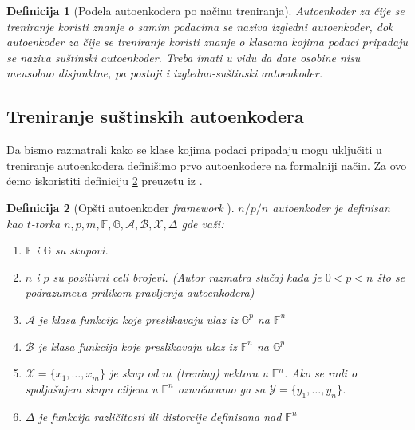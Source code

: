 \documentclass{article}
\newtheorem{definition}{Definicija}
\begin{document}
	\begin{definition}[Podela autoenkodera po na\v cinu treniranja]
		\label{autoencoder-training-based-types}
		Autoenkoder za \v cije se treniranje koristi znanje o samim podacima se naziva \emph{izgledni autoenkoder}, dok autoenkoder za \v cije se treniranje koristi znanje o klasama kojima podaci pripadaju se naziva \emph{su\v stinski autoenkoder}. Treba imati u vidu da date osobine nisu me\dj usobno disjunktne, pa postoji i \emph{izgledno-su\v stinski autoenkoder}.
	\end{definition}


	\subsection{Treniranje su\v stinskih autoenkodera}
	
	Da bismo razmatrali kako se klase kojima podaci pripadaju mogu uklju\v citi u treniranje autoenkodera defini\v simo prvo autoenkodere na formalniji na\v cin. 
	Za ovo \'cemo iskoristiti definiciju \ref{general-autoencoder-framework} preuzetu iz \cite[Poglavlje 2]{pmlr-v27-baldi12a}.
	
	\begin{definition}[Op\v sti autoenkoder \textit{framework} \cite{pmlr-v27-baldi12a}]
		\label{general-autoencoder-framework}
		\sloppy $n/p/n$ autoenkoder je definisan kao $t$-torka $n, p, m, \mathbb{F}, \mathbb{G}, \mathcal{A}, \mathcal{B}, \mathcal{X}, \Delta$ gde va\v zi:
		\begin{enumerate}
			\addtolength{\itemindent}{1em}
			\item $\mathbb{F}$ i $\mathbb{G}$ su skupovi.
			\item $n$ i $p$ su pozitivni celi brojevi. (Autor razmatra slu\v caj kada je $0 < p < n$ \v sto se podrazumeva prilikom pravljenja autoenkodera)
			\item $\mathcal{A}$ je klasa funkcija koje preslikavaju ulaz iz  $\mathbb{G}^p$ na $\mathbb{F}^n$
			\item $\mathcal{B}$ je klasa funkcija koje preslikavaju ulaz iz $\mathbb{F}^n$ na $\mathbb{G}^p$
			\item $\mathcal{X} = \{x_1, \ldots, x_m\}$ je skup od $m$ (trening) vektora u $\mathbb{F}^n$. Ako se radi o spolja\v snjem skupu ciljeva u $\mathbb{F}^n$ ozna\v cavamo ga sa $\mathcal{Y} = \{y_1, \ldots, y_n\}$.
			\item $\Delta$ je funkcija razli\v citosti ili distorcije definisana nad $\mathbb{F}^n$
		\end{enumerate}
	\end{definition}
	
\end{document}
